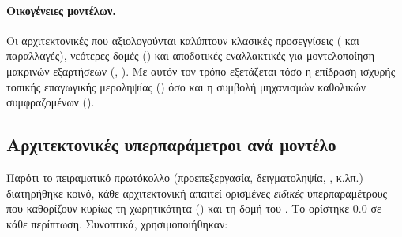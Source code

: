 \paragraph{Οικογένειες μοντέλων.}
Οι αρχιτεκτονικές που αξιολογούνται καλύπτουν κλασικές  προσεγγίσεις
( και παραλλαγές), νεότερες  δομές
() και αποδοτικές εναλλακτικές για μοντελοποίηση
μακρινών εξαρτήσεων (, ). Με αυτόν τον τρόπο
εξετάζεται τόσο η επίδραση ισχυρής τοπικής επαγωγικής μεροληψίας () όσο και η
συμβολή μηχανισμών καθολικών συμφραζομένων ().

\subsection{Αρχιτεκτονικές υπερπαράμετροι ανά μοντέλο}
\label{subsec:arch_hparams}

Παρότι το πειραματικό πρωτόκολλο (προεπεξεργασία, δειγματοληψία, , κ.λπ.)
διατηρήθηκε κοινό, κάθε αρχιτεκτονική απαιτεί ορισμένες \textit{ειδικές}
υπερπαραμέτρους που καθορίζουν κυρίως τη χωρητικότητα () και τη δομή
του . Το  ορίστηκε $0.0$ σε κάθε περίπτωση. Συνοπτικά, χρησιμοποιήθηκαν:

